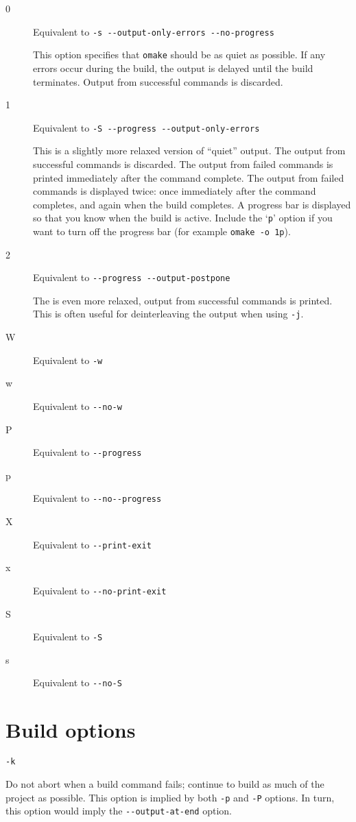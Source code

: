 \begin{description}
\item[0] Equivalent to \verb+-s --output-only-errors --no-progress+

This option specifies that \verb+omake+ should be as quiet as possible.  If any errors occur
during the build, the output is delayed until the build terminates.  Output from successful commands
is discarded.

\item[1] Equivalent to \verb+-S --progress --output-only-errors+

This is a slightly more relaxed version of ``quiet'' output.  The output from successful commands is
discarded.  The output from failed commands is printed immediately after the command complete.  The
output from failed commands is displayed twice: once immediately after the command completes, and
again when the build completes.  A progress bar is displayed so that you know when the build is
active.  Include the `\verb+p+' option if you want to turn off the progress bar (for example
\verb+omake -o 1p+).

\item[2] Equivalent to \verb+--progress --output-postpone+

The is even more relaxed, output from successful commands is printed.
This is often useful for deinterleaving the output when using \verb+-j+.

\item[W] Equivalent to \verb+-w+
\item[w] Equivalent to \verb+--no-w+
\item[P] Equivalent to \verb+--progress+
\item[p] Equivalent to \verb+--no--progress+
\item[X] Equivalent to \verb+--print-exit+
\item[x] Equivalent to \verb+--no-print-exit+
\item[S] Equivalent to \verb+-S+
\item[s] Equivalent to \verb+--no-S+
\end{description}

\section{Build options}

 \verb+-k+

Do not abort when a build command fails; continue to build as much of the project as possible. This
option is implied by both \verb+-p+ and \verb+-P+ options. In turn, this option would imply the
\verb+--output-at-end+ option.

